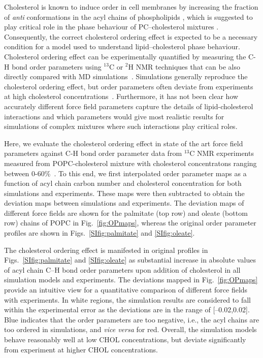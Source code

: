 \documentclass[journal=jctcce]{achemso}
\begin{document}
Cholesterol is known to induce order in cell membranes by increasing the fraction of \textit{anti} conformations in the acyl chains of phospholipids \cite{ferreira13}, which is suggested to play critical role in the phase behaviour of PC--cholesterol mixtures \cite{ipsen87}. Consequently, the correct cholesterol ordering effect is expected to be a necessary condition for a model used to understand lipid--cholesterol phase behaviour. Cholesterol ordering effect can be experimentally quantified by measuring the C-H bond order parameters using $^{13}$C or $^{2}$H NMR techniques that can be also directly compared with MD simulations~\cite{ollila16}. Simulations generally reproduce the cholesterol ordering effect, but order parameters often deviate from experiments at high cholesterol concentrations~\cite{ferreira13,madej15}. Furthermore, it has not been clear how accurately different force field parameters capture the details of lipid-cholesterol interactions and which parameters would give most realistic results for simulations of complex mixtures where such interactions play critical roles. 

Here, we evaluate the cholesterol ordering effect in state of the art force field parameters against C-H bond order parameter data from $^{13}$C NMR experiments measured from POPC-cholesterol mixture with cholesterol concentratons ranging between 0-60\%~\cite{ferreira13}. To this end, we first interpolated order parameter maps as a function of acyl chain carbon number and cholesterol concentration for both simulations and experiments. These maps were then subtracted to obtain the deviation maps between simulations and experiments. The deviation maps of different force fields are shown for the palmitate (top row) and oleate (bottom row) chains of POPC in Fig.~\ref{fig:OPmaps}, whereas the original order parameter profiles are shown in Figs.~\ref{SIfig:palmitate} and \ref{SIfig:oleate}.

The cholesterol ordering effect is manifested in original profiles in Figs.~\ref{SIfig:palmitate} and \ref{SIfig:oleate} as substantial increase in absolute values of acyl chain C--H bond order parameters upon addition of cholesterol in all simulation models and experiments.
The deviations mapped in Fig.~\ref{fig:OPmaps} provide an intuitive view for a quantitative comparison of different force fields with experiments. In white regions, the simulation results are considered to fall within the experimental error as the deviations are in the range of [--0.02,0.02]. Blue indicates that the order parameters are too negative, i.e., the acyl chains are too ordered in simulations, and \textit{vice versa} for red. Overall, the simulation models behave reasonably well at low CHOL concentrations, but deviate significantly from experiment at higher CHOL concentrations. 
\end{document}
